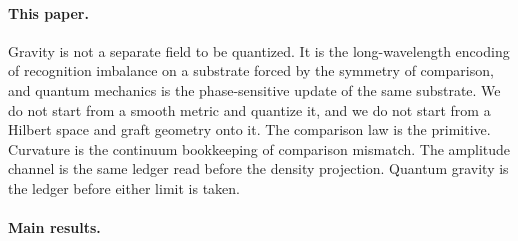 \documentclass[11pt,letterpaper]{article}
\theoremstyle{definition}
\begin{document}
\paragraph{This paper.}
Gravity is not a separate field to be quantized.  It is the
long-wavelength encoding of recognition imbalance on a substrate forced
by the symmetry of comparison, and quantum mechanics is the
phase-sensitive update of the same substrate.  We do not start from a
smooth metric and quantize it, and we do not start from a Hilbert space
and graft geometry onto it.  The comparison law is the primitive.
Curvature is the continuum bookkeeping of comparison mismatch.  The
amplitude channel is the same ledger read before the density
projection.  Quantum gravity is the ledger before either limit is
taken.

\paragraph{Main results.}
\end{document}
